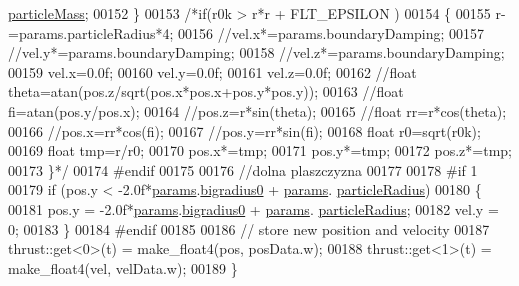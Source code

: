 \begin{DoxyCode}
      \hyperlink{struct_sim_params_afab015432bd796517e5f540f6f7228e4}{particleMass};
00152                 \}
00153                 \textcolor{comment}{/*if(r0k > r*r + FLT\_EPSILON )}
00154 \textcolor{comment}{                \{}
00155 \textcolor{comment}{                        r-=params.particleRadius*4;}
00156 \textcolor{comment}{                        //vel.x*=params.boundaryDamping;}
00157 \textcolor{comment}{                        //vel.y*=params.boundaryDamping;}
00158 \textcolor{comment}{                        //vel.z*=params.boundaryDamping;}
00159 \textcolor{comment}{                        vel.x=0.0f;}
00160 \textcolor{comment}{                        vel.y=0.0f;}
00161 \textcolor{comment}{                        vel.z=0.0f;}
00162 \textcolor{comment}{                        //float theta=atan(pos.z/sqrt(pos.x*pos.x+pos.y*pos.y));}
00163 \textcolor{comment}{                        //float fi=atan(pos.y/pos.x);}
00164 \textcolor{comment}{                        //pos.z=r*sin(theta);}
00165 \textcolor{comment}{                        //float rr=r*cos(theta);}
00166 \textcolor{comment}{                        //pos.x=rr*cos(fi);}
00167 \textcolor{comment}{                        //pos.y=rr*sin(fi);}
00168 \textcolor{comment}{                        float r0=sqrt(r0k);}
00169 \textcolor{comment}{                        float tmp=r/r0;}
00170 \textcolor{comment}{                        pos.x*=tmp;}
00171 \textcolor{comment}{                        pos.y*=tmp;}
00172 \textcolor{comment}{                        pos.z*=tmp;}
00173 \textcolor{comment}{                \}*/}
00174 \textcolor{preprocessor}{#endif}
00175 \textcolor{preprocessor}{}
00176 \textcolor{comment}{//dolna plaszczyzna}
00177 
00178 \textcolor{preprocessor}{#if 1}
00179 \textcolor{preprocessor}{}                \textcolor{keywordflow}{if} (pos.y < -2.0f*\hyperlink{particles__kernel__impl_8cuh_a8db8938e28edd17862daf58651051bdc}{params}.\hyperlink{struct_sim_params_a5809a1ec819f5a99e350ed28b01834fc}{bigradius0} + \hyperlink{particles__kernel__impl_8cuh_a8db8938e28edd17862daf58651051bdc}{params}.
      \hyperlink{struct_sim_params_a7e131c24e1020c44173deb0f57a8c4af}{particleRadius})
00180         \{
00181             pos.y = -2.0f*\hyperlink{particles__kernel__impl_8cuh_a8db8938e28edd17862daf58651051bdc}{params}.\hyperlink{struct_sim_params_a5809a1ec819f5a99e350ed28b01834fc}{bigradius0} + \hyperlink{particles__kernel__impl_8cuh_a8db8938e28edd17862daf58651051bdc}{params}.
      \hyperlink{struct_sim_params_a7e131c24e1020c44173deb0f57a8c4af}{particleRadius};
00182             vel.y = 0;
00183         \}
00184 \textcolor{preprocessor}{#endif}
00185 \textcolor{preprocessor}{}
00186         \textcolor{comment}{// store new position and velocity}
00187         thrust::get<0>(t) = make\_float4(pos, posData.w);
00188         thrust::get<1>(t) = make\_float4(vel, velData.w);
00189     \}
\end{DoxyCode}


